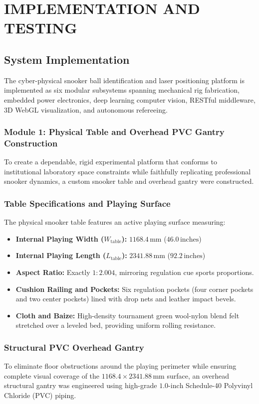 \chapter{IMPLEMENTATION AND TESTING}

\section{System Implementation}
The cyber-physical snooker ball identification and laser positioning platform is implemented as six modular subsystems spanning mechanical rig fabrication, embedded power electronics, deep learning computer vision, RESTful middleware, 3D WebGL visualization, and autonomous refereeing.

\subsection{Module 1: Physical Table and Overhead PVC Gantry Construction}
To create a dependable, rigid experimental platform that conforms to institutional laboratory space constraints while faithfully replicating professional snooker dynamics, a custom snooker table and overhead gantry were constructed.

\subsection{Table Specifications and Playing Surface}
The physical snooker table features an active playing surface measuring:
\begin{itemize}
    \item \textbf{Internal Playing Width ($W_{\text{table}}$):} $1168.4\,\text{mm}$ ($46.0\,\text{inches}$)
    \item \textbf{Internal Playing Length ($L_{\text{table}}$):} $2341.88\,\text{mm}$ ($92.2\,\text{inches}$)
    \item \textbf{Aspect Ratio:} Exactly $1:2.004$, mirroring regulation cue sports proportions.
    \item \textbf{Cushion Railing and Pockets:} Six regulation pockets (four corner pockets and two center pockets) lined with drop nets and leather impact bevels.
    \item \textbf{Cloth and Baize:} High-density tournament green wool-nylon blend felt stretched over a leveled bed, providing uniform rolling resistance.
\end{itemize}

\subsection{Structural PVC Overhead Gantry}
To eliminate floor obstructions around the playing perimeter while ensuring complete visual coverage of the $1168.4 \times 2341.88\,\text{mm}$ surface, an overhead structural gantry was engineered using high-grade $1.0\text{-inch}$ Schedule-40 Polyvinyl Chloride (PVC) piping. 

